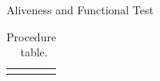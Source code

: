 \begin{stepstable}{\subprocid{} Aliveness and Functional Test}
		\PressSingleOnOscilloscope
		\TakeScreenShotOnOscilloscope
		\SaveOscilloscopeRawValues
	
		\StopCegseSW{}

		\CopyCegseLogsForEvicences{\subprocid}{}
		\CopyOscilloscopeScreenShotsForEvidences
		\GetTempAndHumidityFromDatalogger

		\SetReduntanSideOnXbmaDisableMandC
		\RegisterTempAndHumidity
		\ClosePXISA

\end{stepstable}
\begin{longtable}{|p{17.0cm}|}
	\endfirsthead
	\endfoot
	\caption{Procedure \subprocid \ table.} \label{tb:proc:018-02}
\end{longtable}
